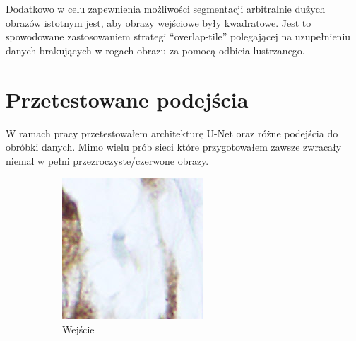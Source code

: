 \documentclass{article}
\begin{document}
Dodatkowo w celu zapewnienia możliwości segmentacji arbitralnie dużych obrazów istotnym jest, aby obrazy wejściowe były kwadratowe. Jest to spowodowane zastosowaniem strategi ``overlap-tile'' polegającej na uzupełnieniu danych brakujących w rogach obrazu za pomocą odbicia lustrzanego.
\newpage
\section{Przetestowane podejścia}
W ramach pracy przetestowałem architekturę U-Net oraz różne podejścia do obróbki danych.
Mimo wielu prób sieci które przygotowałem zawsze zwracały niemal w pełni przezroczyste/czerwone obrazy.
\begin{figure}[H]
    \centering
    \begin{subfigure}{0.4\linewidth}
        \includegraphics[width=\linewidth]{images/0_0_0.png}
        \caption{Wejście}
    \end{subfigure}
    \begin{subfigure}{0.4\linewidth}

\end{subfigure}
\end{figure}
\end{document}
